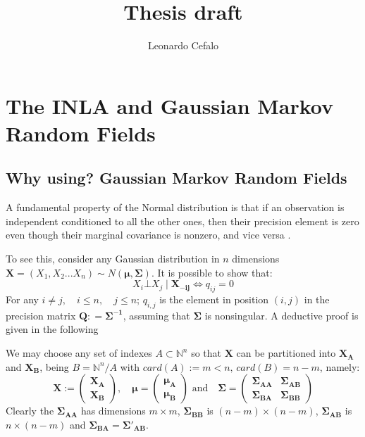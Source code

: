 \documentclass{book}
\title{Thesis draft}
\author{Leonardo Cefalo}
\begin{document}
\maketitle
\tableofcontents
%

\chapter{The INLA and Gaussian Markov Random Fields} \label{chapter:INLA}
\section{Why using? Gaussian Markov Random Fields}\label{section:GMRFs}

A fundamental property of the Normal distribution is that if an observation is independent conditioned to all the other ones, then their precision element is zero even though their marginal covariance is nonzero, and vice versa \cite{GMRFs}.

To see this, consider any Gaussian distribution in $n$ dimensions $\mathbf{X} = (X_1, X_2 .. . X_n) \sim N(\mathbf{\mu}, \mathbf{\Sigma})$. It is possible to show that:
\begin{equation}
		X_i \bot X_j \mid \mathbf{X_{-ij}} \iff q_{ij} = 0
		\label{eq:theorem1}
\end{equation}
	For any $i \neq j,  \quad i \leq n, \quad j\leq n$; $q_{i,j}$ is the element in position $(i,j)$ in the precision matrix $\mathbf{Q}: = \mathbf{\Sigma^{-1}}$, assuming that $\mathbf{\Sigma}$ is nonsingular. 
    A deductive proof is given in the following
	 
	 We may choose any set of indexes $A \subset \mathbb{N}^n$ so that $\mathbf{X}$ can be partitioned into $\mathbf{X_A}$ and $\mathbf{X_B}$, being $B = \mathbb{N}^n / A$ with $card(A) := m<n, \, card(B) = n-m$, namely:
	$$
	\mathbf{X} := \left( \begin{array}{l} \mathbf{X_A} \\ \mathbf{X_B}
		\end{array}
	\right)  , \quad 
		\mathbf{\mu} = \left( \begin{array}{l} \mathbf{\mu_A} \\ \mathbf{\mu_B}
	\end{array}
	\right)
	 \,\, \text{and} \quad 
	\mathbf{\Sigma} = \left( \begin{array}{ll} \mathbf{\Sigma_{AA}} & \mathbf{\Sigma_{AB}}
		 \\ \mathbf{\Sigma_{BA}} & \mathbf{\Sigma_{BB}}
	\end{array}
	\right)
	$$
	Clearly the $\mathbf{\Sigma_{AA}}$ has dimensions $m \times m$, $\mathbf{\Sigma_{BB}}$ is $(n-m) \times (n-m)$,	$\mathbf{\Sigma_{AB}}$ is $n \times (n-m)$ and $\mathbf{\Sigma_{BA}} = \mathbf{\Sigma'_{AB}}$. 
    
\end{document}
